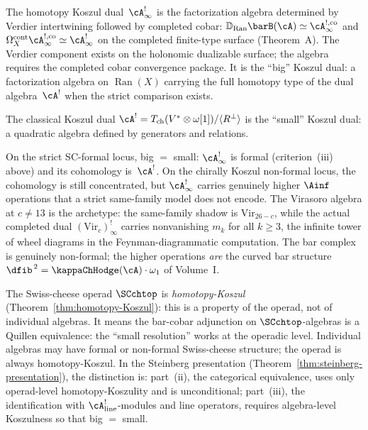 \begin{remark}
\label{rem:big-vs-small}
The homotopy Koszul dual~$\cA^!_\infty$ is the factorization algebra
determined by Verdier intertwining followed by completed cobar:
$\mathbb{D}_{\operatorname{Ran}}\barB(\cA) \simeq
\cA^{!,\mathrm{co}}_\infty$ and
$\Omega_X^{\mathrm{cont}}\cA^{!,\mathrm{co}}_\infty\simeq
\cA^!_\infty$ on the completed finite-type surface
(Theorem~A). The Verdier component exists on the holonomic dualizable
surface; the algebra requires the completed cobar convergence package.
It is the ``big'' Koszul dual: a factorization algebra on
$\operatorname{Ran}(X)$ carrying the full homotopy type of the dual
algebra~$\cA^!$ when the strict comparison exists.

The classical Koszul dual $\cA^! = T_{\mathrm{ch}}(V^* \otimes
\omega[1])/\langle R^\perp\rangle$ is the ``small'' Koszul dual: a
quadratic algebra defined by generators and relations.

On the strict SC-formal locus, big $=$ small: $\cA^!_\infty$ is
formal (criterion~(iii) above) and its cohomology is~$\cA^!$. On the
chirally Koszul non-formal locus, the cohomology is still
concentrated, but $\cA^!_\infty$ carries genuinely higher $\Ainf$
operations that a strict same-family model does not encode. The
Virasoro algebra at $c \neq 13$ is the archetype: the same-family
shadow is $\mathrm{Vir}_{26-c}$, while the actual completed dual
$(\mathrm{Vir}_c)^!_\infty$ carries nonvanishing $m_k$ for all
$k \geq 3$, the infinite tower of wheel diagrams in the
Feynman-diagrammatic computation. The bar complex is genuinely
non-formal; the higher operations \emph{are} the curved bar
structure $\dfib^{\,2} = \kappaChHodge(\cA) \cdot \omega_1$ of Volume~I.

The Swiss-cheese operad $\SCchtop$ is \emph{homotopy-Koszul}
(Theorem~\ref{thm:homotopy-Koszul}): this is a property of the
operad, not of individual algebras. It means the bar-cobar
adjunction on $\SCchtop$-algebras is a Quillen equivalence: the
``small resolution'' works at the operadic level. Individual algebras may have formal or non-formal Swiss-cheese
structure; the operad is always homotopy-Koszul.
In the Steinberg presentation
(Theorem~\ref{thm:steinberg-presentation}), the distinction is:
part~(ii), the categorical equivalence, uses only operad-level
homotopy-Koszulity and is unconditional; part~(iii), the
identification with $\cA^!_{\mathrm{line}}$-modules and line operators, requires
algebra-level Koszulness so that big $=$ small.
\end{remark}

